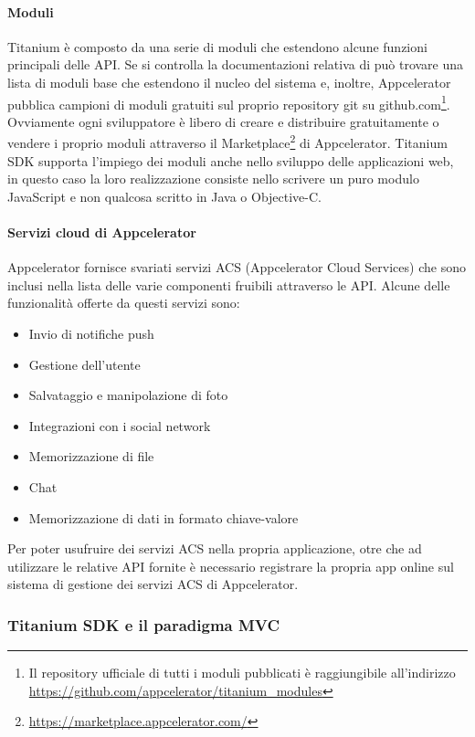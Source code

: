 			\paragraph{Moduli}
				Titanium è composto da una serie di moduli che estendono alcune 
				funzioni principali delle API. Se si controlla la documentazioni 
				relativa di può trovare una lista di moduli base che estendono 
				il nucleo del sistema e, inoltre, Appcelerator pubblica 
				campioni di moduli gratuiti sul proprio repository git su 
				\mbox{github.com}\footnote{Il repository ufficiale di tutti i 
				moduli pubblicati è	raggiungibile all'indirizzo 
				\url{https://github.com/appcelerator/titanium_modules}}. 
				Ovviamente ogni sviluppatore è libero di creare e distribuire 
				gratuitamente o vendere i proprio moduli attraverso il 
				Marketplace\footnote{\url{https://marketplace.appcelerator.com/}} 
				di Appcelerator. Titanium SDK supporta l'impiego dei moduli 
				anche nello sviluppo delle applicazioni web, in questo caso la 
				loro realizzazione consiste nello scrivere un puro modulo 
				JavaScript e non qualcosa scritto in Java o Objective-C.
				
			\paragraph{Servizi cloud di Appcelerator}
				Appcelerator fornisce svariati servizi ACS (Appcelerator Cloud 
				Services) che sono inclusi nella lista delle varie componenti 
				fruibili attraverso le API. Alcune delle funzionalità offerte da 
				questi servizi sono:
				\begin{itemize}
					\item Invio di notifiche push
					\item Gestione dell'utente
					\item Salvataggio e manipolazione di foto
					\item Integrazioni con i social network
					\item Memorizzazione di file
					\item Chat
					\item Memorizzazione di dati in formato chiave-valore
				\end{itemize}
				Per poter usufruire dei servizi ACS nella propria applicazione, 
				otre che ad utilizzare le relative API fornite è necessario 
				registrare la propria app online sul sistema di gestione dei 
				servizi ACS di Appcelerator.
			
			\subsubsection{Titanium SDK e il paradigma MVC}
			
